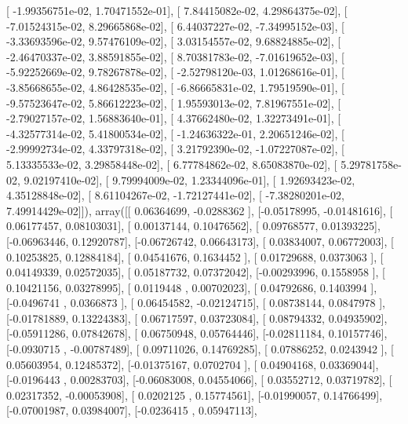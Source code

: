 \documentclass{article}
\begin{document}
       [ -1.99356751e-02,   1.70471552e-01],
       [  7.84415082e-02,   4.29864375e-02],
       [ -7.01524315e-02,   8.29665868e-02],
       [  6.44037227e-02,  -7.34995152e-03],
       [ -3.33693596e-02,   9.57476109e-02],
       [  3.03154557e-02,   9.68824885e-02],
       [ -2.46470337e-02,   3.88591855e-02],
       [  8.70381783e-02,  -7.01619652e-03],
       [ -5.92252669e-02,   9.78267878e-02],
       [ -2.52798120e-03,   1.01268616e-01],
       [ -3.85668655e-02,   4.86428535e-02],
       [ -6.86665831e-02,   1.79519590e-01],
       [ -9.57523647e-02,   5.86612223e-02],
       [  1.95593013e-02,   7.81967551e-02],
       [ -2.79027157e-02,   1.56883640e-01],
       [  4.37662480e-02,   1.32273491e-01],
       [ -4.32577314e-02,   5.41800534e-02],
       [ -1.24636322e-01,   2.20651246e-02],
       [ -2.99992734e-02,   4.33797318e-02],
       [  3.21792390e-02,  -1.07227087e-02],
       [  5.13335533e-02,   3.29858448e-02],
       [  6.77784862e-02,   8.65083870e-02],
       [  5.29781758e-02,   9.02197410e-02],
       [  9.79994009e-02,   1.23344096e-01],
       [  1.92693423e-02,   4.35128848e-02],
       [  8.61104267e-02,  -1.72127441e-02],
       [ -7.38280201e-02,   7.49914429e-02]]), array([[ 0.06364699, -0.0288362 ],
       [-0.05178995, -0.01481616],
       [ 0.06177457,  0.08103031],
       [ 0.00137144,  0.10476562],
       [ 0.09768577,  0.01393225],
       [-0.06963446,  0.12920787],
       [-0.06726742,  0.06643173],
       [ 0.03834007,  0.06772003],
       [ 0.10253825,  0.12884184],
       [ 0.04541676,  0.1634452 ],
       [ 0.01729688,  0.0373063 ],
       [ 0.04149339,  0.02572035],
       [ 0.05187732,  0.07372042],
       [-0.00293996,  0.1558958 ],
       [ 0.10421156,  0.03278995],
       [ 0.0119448 ,  0.00702023],
       [ 0.04792686,  0.1403994 ],
       [-0.0496741 ,  0.0366873 ],
       [ 0.06454582, -0.02124715],
       [ 0.08738144,  0.0847978 ],
       [-0.01781889,  0.13224383],
       [ 0.06717597,  0.03723084],
       [ 0.08794332,  0.04935902],
       [-0.05911286,  0.07842678],
       [ 0.06750948,  0.05764446],
       [-0.02811184,  0.10157746],
       [-0.0930715 , -0.00787489],
       [ 0.09711026,  0.14769285],
       [ 0.07886252,  0.0243942 ],
       [ 0.05603954,  0.12485372],
       [-0.01375167,  0.0702704 ],
       [ 0.04904168,  0.03369044],
       [-0.0196443 ,  0.00283703],
       [-0.06083008,  0.04554066],
       [ 0.03552712,  0.03719782],
       [ 0.02317352, -0.00053908],
       [ 0.0202125 ,  0.15774561],
       [-0.01990057,  0.14766499],
       [-0.07001987,  0.03984007],
       [-0.0236415 ,  0.05947113],
\end{document}
